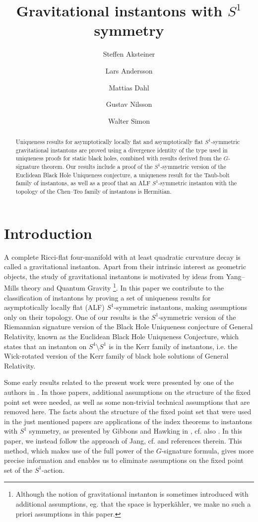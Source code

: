 \documentclass[a4paper,11pt,reqno]{amsart}
\title{Gravitational instantons with $S^1$ symmetry}
\author[S. Aksteiner]{Steffen Aksteiner}
\author[L. Andersson]{Lars Andersson}
\author[M. Dahl]{Mattias Dahl}
\author[G. Nilsson]{Gustav Nilsson}
\author[W. Simon]{Walter Simon}
\theoremstyle{plain}
\numberwithin{equation}{section}
\begin{document}
\begin{abstract}
Uniqueness results for asymptotically locally flat and asymptotically flat $S^1$-symmetric gravitational instantons are proved using a divergence identity of the type used in uniqueness proofs for static black holes, combined with results derived from the $G$-signature theorem. Our results include a proof of the $S^1$-symmetric version of the Euclidean Black Hole Uniqueness conjecture, a uniqueness result for the Taub-bolt family of instantons, as well as a proof that an ALF $S^1$-symmetric instanton with the topology of the Chen--Teo family of instantons is Hermitian.  
\end{abstract} 
\maketitle
\tableofcontents


\section{Introduction}\label{sec:intro}


A complete Ricci-flat four-manifold with at least quadratic curvature decay is called a gravitational instanton. Apart from their intrinsic interest as geometric objects, the study of gravitational instantons is motivated by ideas from Yang--Mills theory and Quantum Gravity   \cite{hawking:1977:grav:instantons}\footnote{Although the notion of gravitational instanton is sometimes introduced with additional assumptions, eg. that the space is hyperk\"ahler, we make no such a priori assumptions in this paper.}. %
%
%
%
%
In this paper we contribute to the classification of instantons by proving a set of uniqueness results for asymptotically locally flat (ALF) $S^1$-symmetric instantons, making assumptions only on their topology. One of our results is the $S^1$-symmetric version of the Riemannian signature version of the Black Hole Uniqueness conjecture of General Relativity, known as the Euclidean Black Hole Uniqueness Conjecture, which states that an instanton on $S^4\setminus S^1$ is in the Kerr family of instantons, i.e. the Wick-rotated version of the Kerr family of black hole solutions of General Relativity.  
 
 
%
%
%
%
Some early results related to the present work were presented by one of the authors in \cite{simon:1995,mars:simon:1999}. In those papers,  additional assumptions on the structure of the fixed point set were needed, as well as some non-trivial technical assumptions that are removed here. The facts about the structure of the fixed point set that were used in the just mentioned papers are applications of the index theorems  to instantons with $S^1$ symmetry, as presented by Gibbons and Hawking in \cite{gibbons:hawking:1979}, cf. also \cite{1979NuPhB.157..377G}. In this paper, we instead follow the approach of 
%
%
Jang, cf.  \cite{2018JGP...133..181J} and references therein.
%
This method, which makes use of the full power of the $G$-signature formula, gives more precise information and enables us to eliminate assumptions on the fixed point set of the $S^1$-action.
\end{document}
